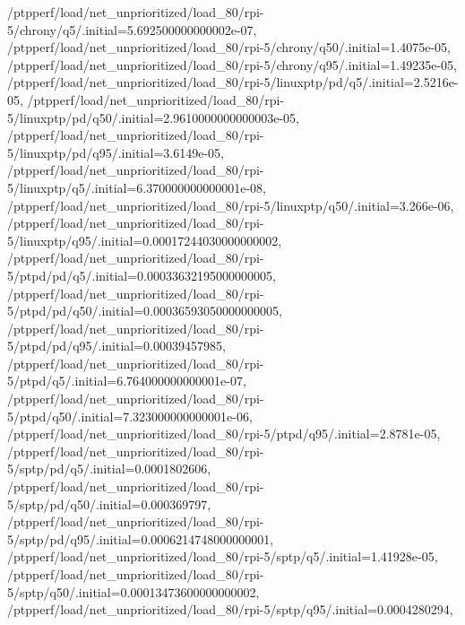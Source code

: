 {    /ptpperf/load/net_unprioritized/load_80/rpi-5/chrony/q5/.initial=5.692500000000002e-07,
    /ptpperf/load/net_unprioritized/load_80/rpi-5/chrony/q50/.initial=1.4075e-05,
    /ptpperf/load/net_unprioritized/load_80/rpi-5/chrony/q95/.initial=1.49235e-05,
    /ptpperf/load/net_unprioritized/load_80/rpi-5/linuxptp/pd/q5/.initial=2.5216e-05,
    /ptpperf/load/net_unprioritized/load_80/rpi-5/linuxptp/pd/q50/.initial=2.9610000000000003e-05,
    /ptpperf/load/net_unprioritized/load_80/rpi-5/linuxptp/pd/q95/.initial=3.6149e-05,
    /ptpperf/load/net_unprioritized/load_80/rpi-5/linuxptp/q5/.initial=6.370000000000001e-08,
    /ptpperf/load/net_unprioritized/load_80/rpi-5/linuxptp/q50/.initial=3.266e-06,
    /ptpperf/load/net_unprioritized/load_80/rpi-5/linuxptp/q95/.initial=0.00017244030000000002,
    /ptpperf/load/net_unprioritized/load_80/rpi-5/ptpd/pd/q5/.initial=0.00033632195000000005,
    /ptpperf/load/net_unprioritized/load_80/rpi-5/ptpd/pd/q50/.initial=0.00036593050000000005,
    /ptpperf/load/net_unprioritized/load_80/rpi-5/ptpd/pd/q95/.initial=0.00039457985,
    /ptpperf/load/net_unprioritized/load_80/rpi-5/ptpd/q5/.initial=6.764000000000001e-07,
    /ptpperf/load/net_unprioritized/load_80/rpi-5/ptpd/q50/.initial=7.323000000000001e-06,
    /ptpperf/load/net_unprioritized/load_80/rpi-5/ptpd/q95/.initial=2.8781e-05,
    /ptpperf/load/net_unprioritized/load_80/rpi-5/sptp/pd/q5/.initial=0.0001802606,
    /ptpperf/load/net_unprioritized/load_80/rpi-5/sptp/pd/q50/.initial=0.000369797,
    /ptpperf/load/net_unprioritized/load_80/rpi-5/sptp/pd/q95/.initial=0.0006214748000000001,
    /ptpperf/load/net_unprioritized/load_80/rpi-5/sptp/q5/.initial=1.41928e-05,
    /ptpperf/load/net_unprioritized/load_80/rpi-5/sptp/q50/.initial=0.00013473600000000002,
    /ptpperf/load/net_unprioritized/load_80/rpi-5/sptp/q95/.initial=0.0004280294,}